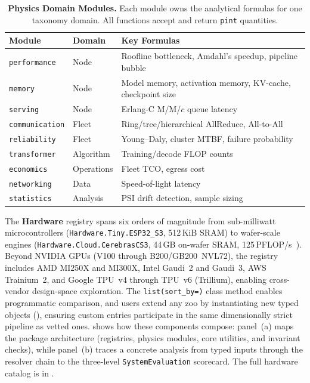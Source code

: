 \documentclass[10pt,twocolumn]{article}
\begin{document}
\begin{table}[!t]
\centering
\caption{\textbf{Physics Domain Modules.} Each module owns the analytical formulas for one taxonomy domain. All functions accept and return \texttt{pint} quantities.}
\label{tab:physics-modules}
\small
\renewcommand{\arraystretch}{1.08}
\begin{tabularx}{\columnwidth}{@{}l l X@{}}
\toprule
\textbf{Module} & \textbf{Domain} & \textbf{Key Formulas} \\
\midrule
\texttt{performance}    & Node        & Roofline bottleneck, Amdahl's speedup, pipeline bubble \\
\texttt{memory}         & Node        & Model memory, activation memory, KV-cache, checkpoint size \\
\texttt{serving}        & Node        & Erlang-C M/M/$c$ queue latency \\
\texttt{communication}  & Fleet       & Ring/tree/hierarchical AllReduce, All-to-All \\
\texttt{reliability}    & Fleet       & Young--Daly, cluster MTBF, failure probability \\
\texttt{transformer}    & Algorithm   & Training/decode FLOP counts \\
\texttt{economics}      & Operations  & Fleet TCO, egress cost \\
\texttt{networking}     & Data        & Speed-of-light latency \\
\texttt{statistics}     & Analysis    & PSI drift detection, sample sizing \\
\bottomrule
\end{tabularx}
\end{table}

The \textbf{Hardware} registry spans six orders of magnitude from sub-milliwatt microcontrollers (\texttt{Hardware.Tiny.ESP32\_S3}, 512\,KiB SRAM) to wafer-scale engines (\texttt{Hardware.Cloud.CerebrasCS3}, 44\,GB on-wafer SRAM, 125\,PFLOP/s~\citep{lie2022cerebras}). Beyond NVIDIA GPUs (V100 through B200/GB200~NVL72), the registry includes AMD MI250X and MI300X, Intel Gaudi~2 and Gaudi~3, AWS Trainium~2, and Google TPU~v4 through TPU~v6 (Trillium), enabling cross-vendor design-space exploration. The \texttt{list(sort\_by=)} class method enables programmatic comparison, and users extend any zoo by instantiating new typed objects (), ensuring custom entries participate in the same dimensionally strict pipeline as vetted ones.  shows how these components compose: panel~(a) maps the package architecture (registries, physics modules, core utilities, and invariant checks), while panel~(b) traces a concrete analysis from typed inputs through the resolver chain to the three-level \texttt{SystemEvaluation} scorecard. The full hardware catalog is in .
\end{document}
